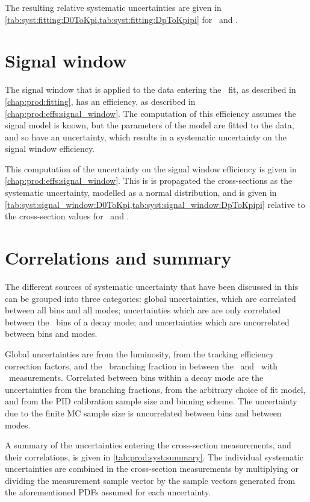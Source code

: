 The resulting relative systematic uncertainties are given in 
\cref{tab:syst:fitting:D0ToKpi,tab:syst:fitting:DpToKpipi} for \DzToKpi\ and 
\DpToKpipi.

\section{Signal window}
\label{chap:prod:syst:signal_window}

The signal window that is applied to the data entering the \lnipchisq\ fit, as 
described in \cref{chap:prod:fitting}, has an efficiency, as described in 
\cref{chap:prod:effs:signal_window}.
The computation of this efficiency assumes the signal model is known, but the 
parameters of the model are fitted to the data, and so have an uncertainty, 
which results in a systematic uncertainty on the signal window efficiency.

This computation of the uncertainty on the signal window efficiency is given in
\cref{chap:prod:effs:signal_window}.
This is is propagated the cross-sections as the systematic uncertainty, 
modelled as a normal distribution, and is given in 
\cref{tab:syst:signal_window:D0ToKpi,tab:syst:signal_window:DpToKpipi} relative 
to the cross-section values for \DzToKpi\ and \DpToKpipi.

\section{Correlations and summary}
\label{chap:prod:syst:correlations}

The different sources of systematic uncertainty that have been discussed in 
this  can be grouped into three categories:
global uncertainties, which are correlated between all bins and all modes; 
uncertainties which are are only correlated
between the \pTy\ bins of a decay mode; and uncertainties which are 
uncorrelated between bins and modes.

Global uncertainties are from the luminosity, from the tracking efficiency 
correction factors, and the \DzToKpi\ branching fraction in between the 
\DzToKpi\ and \DstToDzpi\ with \DzToKpi\ measurements.
Correlated between bins within a decay mode are the uncertainties from the 
branching fractions, from the arbitrary choice of fit model, and from the 
\ac{PID} calibration sample size and binning scheme.
The uncertainty due to the finite \ac{MC} sample size is uncorrelated between 
bins and between modes.

A summary of the uncertainties entering the cross-section measurements, and 
their correlations, is given in \cref{tab:prod:syst:summary}.
The individual systematic uncertainties are combined in the cross-section 
measurements by multiplying or dividing the measurement sample vector by the 
sample vectors generated from the aforementioned \acp{PDF} assumed for each 
uncertainty.

